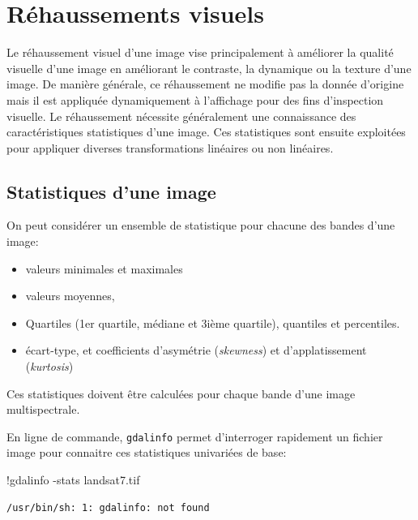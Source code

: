 \documentclass[
  french,
  11pt,
  letterpaper,
  open=any,
  twoside=false,
  french]{scrbook}
\newenvironment{Shaded}{\begin{snugshade}}{\end{snugshade}}
\newcommand{\NormalTok}[1]{\textcolor[rgb]{0.00,0.23,0.31}{#1}}
\newcommand{\OperatorTok}[1]{\textcolor[rgb]{0.37,0.37,0.37}{#1}}
\begin{document}
\section{Réhaussements visuels}\label{ruxe9haussements-visuels}

Le réhaussement visuel d'une image vise principalement à améliorer la
qualité visuelle d'une image en améliorant le contraste, la dynamique ou
la texture d'une image. De manière générale, ce réhaussement ne modifie
pas la donnée d'origine mais il est appliquée dynamiquement à
l'affichage pour des fins d'inspection visuelle. Le réhaussement
nécessite généralement une connaissance des caractéristiques
statistiques d'une image. Ces statistiques sont ensuite exploitées pour
appliquer diverses transformations linéaires ou non linéaires.

\subsection{Statistiques d'une image}\label{statistiques-dune-image}

On peut considérer un ensemble de statistique pour chacune des bandes
d'une image:

\begin{itemize}
\item
  valeurs minimales et maximales
\item
  valeurs moyennes,
\item
  Quartiles (1er quartile, médiane et 3ième quartile), quantiles et
  percentiles.
\item
  écart-type, et coefficients d'asymétrie (\emph{skewness}) et
  d'applatissement (\emph{kurtosis})
\end{itemize}

Ces statistiques doivent être calculées pour chaque bande d'une image
multispectrale.

En ligne de commande, \texttt{gdalinfo} permet d'interroger rapidement
un fichier image pour connaitre ces statistiques univariées de base:

\begin{Shaded}
\begin{Highlighting}[]
\OperatorTok{!}\NormalTok{gdalinfo }\OperatorTok{{-}}\NormalTok{stats landsat7.tif}
\end{Highlighting}
\end{Shaded}

\begin{verbatim}
/usr/bin/sh: 1: gdalinfo: not found
\end{verbatim}
\end{document}
